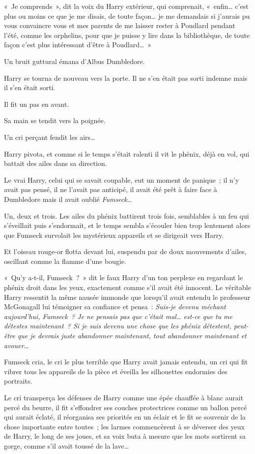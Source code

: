 «~Je comprends~», dit la voix du Harry extérieur, qui comprenait, «~enfin… c'est plus ou moins ce que je me disais, de toute façon… je me demandais si j'aurais pu vous convaincre vous et mes parents de me laisser rester à Poudlard pendant l'été, comme les orphelins, pour que je puisse y lire dans la bibliothèque, de toute façon c'est plus intéressant d'être à Poudlard…~»

Un bruit guttural émana d'Albus Dumbledore.

Harry se tourna de nouveau vers la porte. Il ne s'en était pas sorti indemne mais il s'en était sorti.

Il fit un pas en avant.

Sa main se tendit vers la poignée.

Un cri perçant fendit les airs…

Harry pivota, et comme si le temps s'était ralenti il vit le phénix, déjà en vol, qui battait des ailes dans sa direction.

Le vrai Harry, celui qui se savait coupable, eut un moment de panique~; il n'y avait pas pensé, il ne l'avait pas anticipé, il avait été prêt à faire face à Dumbledore mais il avait oublié \emph{Fumseck}…

Un, deux et trois. Les ailes du phénix battirent trois fois, semblables à un feu qui s'éveillait puis s'endormait, et le temps sembla s'écouler bien trop lentement alors que Fumseck survolait les mystérieux appareils et se dirigeait vers Harry.

Et l'oiseau rouge-or flotta devant lui, suspendu par de doux mouvements d'ailes, oscillant comme la flamme d'une bougie.

«~Qu'y a-t-il, Fumseck~?~» dit le faux Harry d'un ton perplexe en regardant le phénix droit dans les yeux, exactement comme s'il avait été innocent. Le véritable Harry ressentit la même nausée immonde que lorsqu'il avait entendu le professeur McGonagall lui témoigner sa confiance et pensa~: \emph{Suis-je devenu méchant aujourd'hui, Fumseck~? Je ne pensais pas que c'était mal… est-ce que tu me détestes maintenant~? Si je suis devenu une chose que les phénix détestent, peut-être que je devrais juste abandonner maintenant, tout abandonner maintenant et avouer…}

Fumseck cria, le cri le plus terrible que Harry avait jamais entendu, un cri qui fit vibrer tous les appareils de la pièce et éveilla les silhouettes endormies des portraits.

Le cri transperça les défenses de Harry comme une épée chauffée à blanc aurait percé du beurre, il fit s'effondrer ses couches protectrices comme un ballon percé qui aurait éclaté, il réorganisa ses priorités en un éclair et le fit se souvenir de la chose importante entre toutes~; les larmes commencèrent à se déverser des yeux de Harry, le long de ses joues, et sa voix buta à mesure que les mots sortirent sa gorge, comme s'il avait toussé de la lave…

